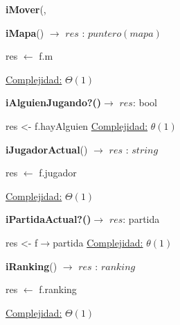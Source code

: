 \documentclass[10pt,a4paper]{article}
\begin{document}
\begin{Algoritmos}
\begin{algorithm}[H]{\textbf{iMover}(, }
    \end{algorithm}
        
    \begin{algorithm}[H]{\textbf{iMapa}() $\to$ $res$ : $puntero(mapa)$}
        \begin{algorithmic}
        
            \State res $\leftarrow$ f.m
            
        
            \Statex \underline{Complejidad:} $\Theta(1)$
        \end{algorithmic}
    \end{algorithm}
    
    \begin{algorithm}[H]{\textbf{iAlguienJugando?()}}$\to$ $res$: bool
        \begin{algorithmic}
            \State res <- f.hayAlguien
            \State \underline{Complejidad:} $\theta(1)$
        \end{algorithmic}
    \end{algorithm}

    \begin{algorithm}[H]{\textbf{iJugadorActual}() $\to$ $res$ : $string$}
        \begin{algorithmic}
        
            \State res $\leftarrow$ f.jugador
            
        
            \Statex \underline{Complejidad:} $\Theta(1)$
        \end{algorithmic}
    \end{algorithm}

    \begin{algorithm}[H]{\textbf{iPartidaActual?()}}$\to$ $res$: partida
        \begin{algorithmic}
            \State res <- f$\to$partida
            \State \underline{Complejidad:} $\theta(1)$
        \end{algorithmic}
    \end{algorithm}
        
    \begin{algorithm}[H]{\textbf{iRanking}() $\to$ $res$ : $ranking$}
        \begin{algorithmic}
        
            \State res $\leftarrow$ f.ranking
            
        
            \Statex \underline{Complejidad:} $\Theta(1)$
        \end{algorithmic}
    \end{algorithm}


\end{Algoritmos}
\end{document}
